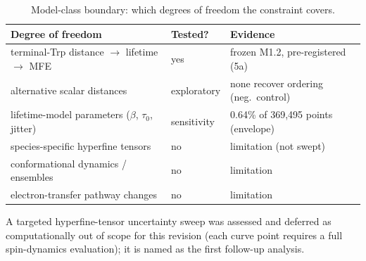 \documentclass[12pt,a4paper]{article}
\begin{document}
\begin{table}[h]
\centering\small
\caption{Model-class boundary: which degrees of freedom the constraint covers.}
\begin{tabular}{lll}
\hline
Degree of freedom & Tested? & Evidence \\
\hline
terminal-Trp distance $\to$ lifetime $\to$ MFE & yes & frozen M1.2, pre-registered (5a) \\
alternative scalar distances & exploratory & none recover ordering (neg.\ control) \\
lifetime-model parameters ($\beta$, $\tau_0$, jitter) & sensitivity & 0.64\% of 369{,}495 points (envelope) \\
species-specific hyperfine tensors & no & limitation (not swept) \\
conformational dynamics / ensembles & no & limitation \\
electron-transfer pathway changes & no & limitation \\
\hline
\end{tabular}
\end{table}
A targeted hyperfine-tensor uncertainty sweep was assessed and deferred as computationally out of scope for this revision (each curve point requires a full spin-dynamics evaluation); it is named as the first follow-up analysis.
\end{document}
